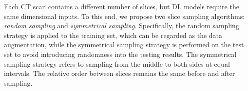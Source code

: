 \documentclass[letterpaper]{article}
\begin{document}


Each CT scan contains a different number of slices, but DL models require the same dimensional inputs. To this end, we propose two slice sampling algorithms: \textit{random sampling} and \textit{symmetrical sampling}. Specifically, the random sampling strategy is applied to the training set, which can be regarded as the data augmentation, while the symmetrical sampling strategy is performed on the test set to avoid introducing randomness into the testing results. The symmetrical sampling strategy refers to sampling from the middle to both sides at equal intervals. The relative order between slices remains the same before and after sampling.

\end{document}
